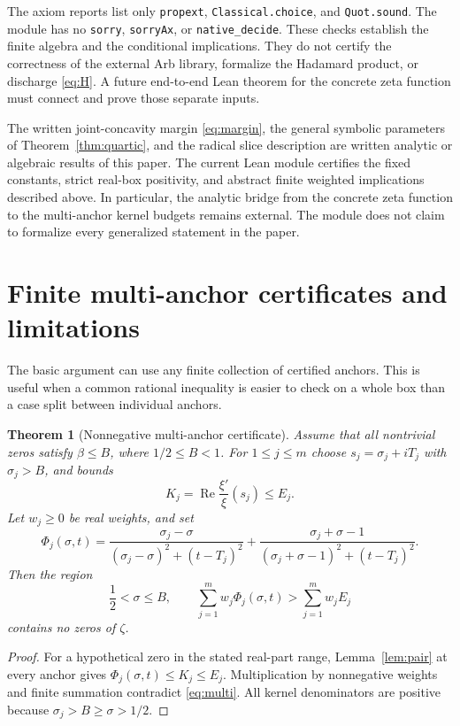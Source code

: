 \documentclass[11pt,a4paper]{article}
\newtheorem{theorem}{Theorem}[section]
\theoremstyle{definition}
\newcommand{\Rea}{\operatorname{Re}}
\newcommand{\src}[1]{\nolinkurl{#1}}
\begin{document}
The axiom reports list only
\texttt{propext}, \texttt{Classical.choice}, and \texttt{Quot.sound}.
The module has no \src{sorry}, \src{sorryAx}, or
\src{native_decide}. These checks establish the finite algebra
and the conditional implications. They do not certify the
correctness of the external Arb library, formalize the
Hadamard product, or discharge \eqref{eq:H}. A future
end-to-end Lean theorem for the concrete zeta function must
connect and prove those separate inputs.

The written joint-concavity margin \eqref{eq:margin}, the
general symbolic parameters of Theorem~\ref{thm:quartic},
and the radical slice description are written analytic or
algebraic results of this paper. The current Lean module certifies
the fixed constants, strict real-box positivity, and abstract finite
weighted implications described above. In particular, the analytic
bridge from the concrete zeta function to the multi-anchor kernel
budgets remains external. The module does not claim to formalize
every generalized statement in the paper.

\section{Finite multi-anchor certificates and limitations}
\label{sec:multi}

The basic argument can use any finite collection of certified
anchors. This is useful when a common rational inequality is
easier to check on a whole box than a case split between
individual anchors.

\begin{theorem}[Nonnegative multi-anchor certificate]\label{thm:multi}
Assume that all nontrivial zeros satisfy $\beta\le B$, where
$1/2\le B<1$. For $1\le j\le m$ choose
$s_j=\sigma_j+iT_j$ with $\sigma_j>B$, and bounds
\[
 K_j=\Rea\frac{\xi'}{\xi}(s_j)\le E_j.
\]
Let $w_j\ge0$ be real weights, and set
\[
 \Phi_j(\sigma,t)=
 \frac{\sigma_j-\sigma}{(\sigma_j-\sigma)^2+(t-T_j)^2}
 +\frac{\sigma_j+\sigma-1}{(\sigma_j+\sigma-1)^2+(t-T_j)^2}.
\]
Then the region
\begin{equation}\label{eq:multi}
 \frac12<\sigma\le B,\qquad
 \sum_{j=1}^m w_j\Phi_j(\sigma,t)>
 \sum_{j=1}^m w_jE_j
\end{equation}
contains no zeros of $\zeta$.
\end{theorem}

\begin{proof}
For a hypothetical zero in the stated real-part range,
Lemma~\ref{lem:pair} at every anchor gives
$\Phi_j(\sigma,t)\le K_j\le E_j$. Multiplication by
nonnegative weights and finite summation contradict
\eqref{eq:multi}. All kernel denominators are positive
because $\sigma_j>B\ge\sigma>1/2$.
\end{proof}
\end{document}

